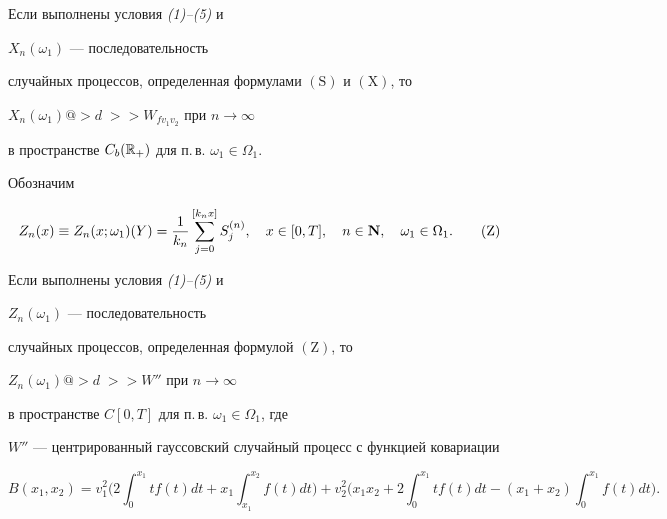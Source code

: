 \begin{thm}


Если выполнены условия {\em (1)--(5)} и


$X_{n}(\omega_1)$ --- последовательность


случайных процессов, определенная формулами $(\mathrm S)$ и $(\mathrm X)$, то


$X_{n}(\omega_1) @>d\;>> W_{fv_1v_2}$ при $n\to\infty$


в пространстве $C_b(\Bbb R_+)$ для п.\,в. $\omega_1 \in \Omega_1$.


\end{thm}





Обозначим


\begin{equation}


Z_{n}(x)\equiv Z_{n}(x;\omega_1)(Y)


=\frac {1}{k_n}\sum_{j=0}^{[k_nx]}S^{(n)}_j, \quad x\in[0,T],


\quad n\in\N,\quad \omega_1\in\Omega_1.


\tag{$\mathrm Z$}


\end{equation}








\begin{thm}


Если выполнены условия {\em (1)--(5)} и


$Z_{n}(\omega_1)$ --- последовательность


случайных процессов, определенная формулой $(\mathrm Z)$, то


$Z_n(\omega_1) @>d\;>> W''$ при $n\to\infty$


в пространстве $C[0,T]$ для п.\,в. $\omega_1 \in \Omega_1$, где


$W''$ --- центрированный гауссовский случайный процесс с функцией ковариации


$$


B(x_1, x_2)= v^2_1\bigg(2\int_0^{x_1} tf(t)dt+x_1\int_{x_1}^{x_2}


f(t)dt\bigg)+v^2_2\bigg(x_1x_2+2\int_0^{x_1} tf(t)dt-


(x_1+x_2)\int_0^{x_1}f(t)dt \bigg).


$$


\end{thm}








